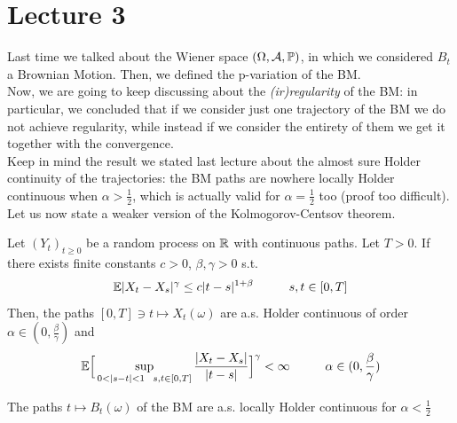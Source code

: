 \section{Lecture 3}
Last time we talked about the Wiener space $(\Omega, \mathcal{A}, \mathbb{P})$, in which we considered $B_t$ a Brownian Motion. Then, we defined the p-variation of the BM.\\
Now, we are going to keep discussing about the \emph{(ir)regularity} of the BM: in particular, we concluded that if we consider just one trajectory of the BM we do not achieve regularity, while instead if we consider the entirety of them we get it together with the convergence. \\
Keep in mind the result we stated last lecture about the almost sure Holder continuity of the trajectories: the BM paths are nowhere locally Holder continuous when $\alpha > \frac{1}{2}$, which is actually valid for $\alpha = \frac{1}{2}$ too (proof too difficult).\\
Let us now state a weaker version of the Kolmogorov-Centsov theorem. 
\begin{ThBox}
    \begin{Th}
    Let $(Y_t)_{t \geq 0}$ be a random process on $\mathbb{R}$ with continuous paths. Let $T>0$. If there exists finite constants $c>0$, $\beta, \gamma >0$ s.t.
    \begin{equation*}
        \mathbb{E}|X_t-X_s|^\gamma \leq c|t-s|^{1+\beta} \hspace{1 cm } s, t \in [0,T]    \end{equation*}
 Then, the paths $[0,T] \owns t \mapsto X_t (\omega)$ are a.s. Holder continuous of order $\alpha \in (0, \frac{\beta}{\gamma})$ and  
 \begin{equation*}
     \mE \Big[\sup_{0 < |s-t|< 1 \ \ s,t \in [0,T]} \frac{|X_t-X_s|}{|t-s|}\Big]^\gamma< \infty \hspace{ 1 cm} \alpha \in (0, \frac{\beta}{\gamma})
 \end{equation*}
\end{Th}
\end{ThBox}
\begin{PropBox}
    \begin{Cor}
    The paths $t \mapsto B_t(\omega)$ of the BM are a.s. locally Holder continuous for $\alpha < \frac{1}{2}$
\end{Cor}
\end{PropBox}
